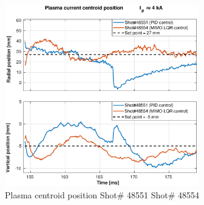 \begin{figure}
	\centering
	\includegraphics[width=0.75\textwidth]{Chp5/PIDvsMIMO_551_554_2.eps}
	\caption{Plasma centroid position  Shot\# 48551 Shot\# 48554}
\end{figure}

